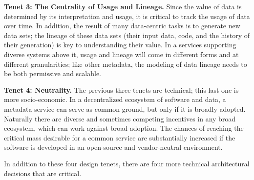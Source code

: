 \documentclass[10pt,letterpaper]{article}
\begin{document}
\vspace{0.5em}\noindent
\textbf{Tenet 3: The Centrality of Usage and Lineage.}  Since the value of data is determined by its interpretation and usage, it is critical to track the usage of data over time.  In addition, the result of many data-centric tasks is to generate new data sets; the lineage of these data sets (their input data, code, and the history of their generation) is key to understanding their value. In a services supporting diverse systems above it, usage and lineage will come in different forms and at different granularities; like other metadata, the modeling of data lineage needs to be both permissive and scalable.

\vspace{0.5em}\noindent
\textbf{Tenet 4: Neutrality.}  The previous three tenets are technical; this last one is more socio-economic.  In a decentralized ecosystem of software and data, a metadata service can serve as common ground, but only if it is broadly adopted.  Naturally there are diverse and sometimes competing incentives in any broad ecosystem, which can work against broad adoption.  The chances of reaching the critical mass desirable for a common service are substantially increased if the software is developed in an open-source and vendor-neutral environment.  


In addition to these four design tenets, there are four more technical architectural decisions that are critical.
\end{document}
